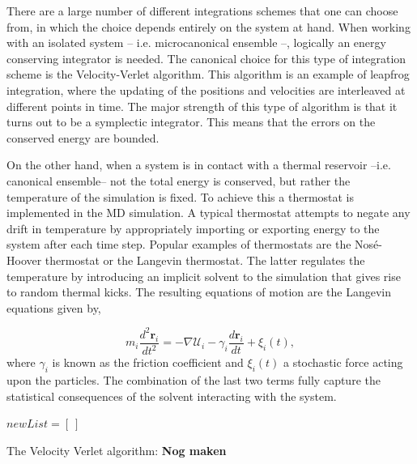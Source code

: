 \noindent There are a large number of different integrations schemes that one can choose
from, in which the choice depends entirely on the system at hand.
When working with an isolated system -- i.e. microcanonical ensemble --, logically an
energy conserving integrator is needed. The canonical
choice for this type of integration scheme is the Velocity-Verlet algorithm. This
algorithm is an example of leapfrog integration, where the updating of the positions
and velocities are interleaved at different points in time. The major strength of this
type of algorithm is that it turns out to be a symplectic integrator. This means that the
errors on the conserved energy are bounded.

On the other hand, when a system is in contact with a thermal reservoir --i.e. canonical
ensemble-- not the total energy is conserved, but rather the temperature of the
simulation is fixed. To achieve this a thermostat is implemented in the MD
simulation. A typical thermostat attempts to negate any drift in temperature by
appropriately importing or exporting energy to the system after each time step.
Popular examples of thermostats are the Nos\'e-Hoover thermostat or the Langevin
thermostat. The latter regulates the temperature by introducing an implicit solvent to
the simulation that gives rise to random thermal kicks. The resulting equations of motion
are the Langevin equations given by,

\begin{equation}
    m_i \frac{d^2 \boldsymbol{r}_i}{dt^2} = - \nabla \mathcal{U}_i - \gamma_i \frac{d
    \boldsymbol{r}_i}{d t} +
    \xi_i(t),
\end{equation}
where $\gamma_i$ is known  as the friction coefficient and $\xi_i(t)$ a stochastic force
acting upon the particles. The combination of the last two terms fully capture the
statistical consequences of the solvent interacting with the system.


\begin{algorithm}


    $newList = [\ ]$



    \caption{The Velocity Verlet algorithm: \textbf{Nog maken}}
\end{algorithm}

